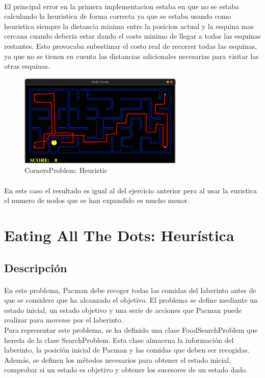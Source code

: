 \documentclass{report}
\begin{document}
          \paragraph*{}{
            El principal error en la primera implementacion estaba en que no se estaba calculando la heuristica de forma correcta ya que se estaba usando como heuristica siempre la distancia minima entre la posicion actual y la esquina mas cercana cuando deberia estar dando el coste minimo de llegar a todas las esquinas restantes.
            Esto provocaba subestimar el costo real de recorrer todas las esquinas, ya que no se tienen en cuenta las distancias adicionales necesarias para visitar las otras esquinas.
          }
          \begin{figure}[H]
            \centering
            \includegraphics[width=0.7\textwidth]{.img/2.5-6.1.png}
            \caption{CornersProblem: Heuristic}
          \end{figure}
          \paragraph*{}{
            En este caso el resultado es igual al del ejercicio anterior pero al usar la euristica el numero de nodos que se han expandido es mucho menor.
          }
      \clearpage\section{Eating All The Dots: Heurística}
        \subsection*{Descripción}
          \paragraph*{}{
            En este problema, Pacman debe recoger todas las comidas del laberinto antes de que se considere que ha alcanzado el objetivo. El problema se define mediante un estado inicial, un estado objetivo y una serie de acciones que Pacman puede realizar para moverse por el laberinto.\\
            Para representar este problema, se ha definido una clase FoodSearchProblem que hereda de la clase SearchProblem. Esta clase almacena la información del laberinto, la posición inicial de Pacman y las comidas que deben ser recogidas. Además, se definen los métodos necesarios para obtener el estado inicial, comprobar si un estado es objetivo y obtener los sucesores de un estado dado.\\
          }
\end{document}
